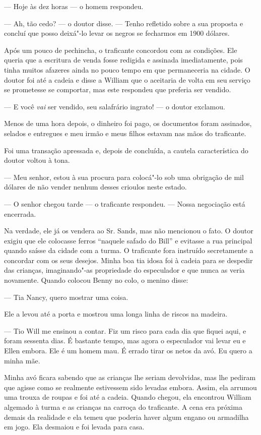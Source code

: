 --- Hoje às dez horas --- o homem respondeu.

--- Ah, tão cedo? --- o doutor disse. --- Tenho refletido sobre a sua
proposta e concluí que posso deixá"-lo levar os negros se fecharmos em
1900 dólares.

Após um pouco de pechincha, o traficante concordou com as condições. Ele
queria que a escritura de venda fosse redigida e assinada imediatamente,
pois tinha muitos afazeres ainda no pouco tempo em que permaneceria na
cidade. O doutor foi até a cadeia e disse a William que o aceitaria de
volta em seu serviço se prometesse se comportar, mas este respondeu que
preferia ser vendido.

--- E você \emph{vai} ser vendido, seu salafrário ingrato! --- o doutor
exclamou.

Menos de uma hora depois, o dinheiro foi pago, os documentos foram
assinados, selados e entregues e meu irmão e meus filhos estavam nas
mãos do traficante.

Foi uma transação apressada e, depois
de concluída, a cautela característica do doutor voltou à tona.

--- Meu senhor, estou à sua procura para colocá"-lo sob uma obrigação de
mil dólares de não vender nenhum desses crioulos neste estado.

--- O senhor chegou tarde --- o traficante respondeu. --- Nossa
negociação está encerrada.

Na verdade, ele já os vendera ao Sr. Sands, mas não mencionou o fato. O
doutor exigiu que ele colocasse ferros ``naquele safado do Bill'' e
evitasse a rua principal quando saísse da cidade com a turma. O
traficante fora instruído secretamente a concordar com os seus desejos.
Minha boa tia idosa foi à cadeia para se despedir das crianças,
imaginando"-as propriedade do especulador e que nunca as veria novamente.
Quando colocou Benny no colo, o menino disse:

--- Tia Nancy, quero mostrar uma coisa.

Ele a levou até a porta e mostrou uma longa linha de riscos na madeira.

--- Tio Will me ensinou a contar. Fiz um risco para cada dia que fiquei
aqui, e foram sessenta dias. É bastante tempo, mas agora o especulador
vai levar eu e Ellen embora. Ele é um homem mau. É errado tirar os netos
da avó. Eu quero a minha mãe.

Minha avó ficara sabendo que as
crianças lhe seriam devolvidas, mas lhe pediram que agisse como se
realmente estivessem sido levadas embora. Assim, ela arrumou uma trouxa
de roupas e foi até a cadeia. Quando chegou, ela encontrou William
algemado à turma e as crianças na carroça do traficante. A cena era
próxima demais da realidade e ela temeu que poderia haver algum engano
ou armadilha em jogo. Ela desmaiou e foi levada para casa.


